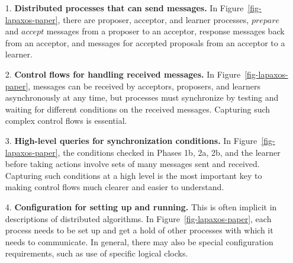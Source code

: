 \documentclass[11pt]{article}
\newcommand\m[1]{\mbox{$#1$}} %
\begin{document}
\begin{enumerate}
  \setlength{\itemsep}{0ex}

\item[1.] {\bf Distributed processes that can send messages.}  In
  Figure~\ref{fig-lapaxos-paper},$\!$ there are proposer, acceptor, and learner
  processes, \m{prepare} and \m{accept} messages from a proposer to an
  acceptor, response messages back from an acceptor, and messages for
  accepted proposals from an acceptor to a learner.

\item[2.] {\bf Control flows for handling received messages.}  In
  Figure~\ref{fig-lapaxos-paper}, messages can be received by acceptors,
  proposers, and learners asynchronously at any time, but processes must
  synchronize by testing and waiting for different conditions on the
  received messages.  Capturing such complex control flows is essential.

\item[3.] {\bf High-level queries for synchronization conditions.} In
  Figure~\ref{fig-lapaxos-paper}, the conditions checked in Phases 1b, 2a, 2b, and the
  learner before taking actions involve sets of many messages sent and
  received.  Capturing such conditions at a high level is the most
  important key to making control flows much clearer and easier to
  understand.

\item[4.] {\bf Configuration for setting up and running.}  This is often
  implicit in descriptions of distributed algorithms.  In
  Figure~\ref{fig-lapaxos-paper}, each process needs to be set up and get a
  hold of other processes with which it needs to communicate.  In general,
  there may also be special configuration requirements, such as use of
  specific logical clocks.

\end{enumerate}
\end{document}

